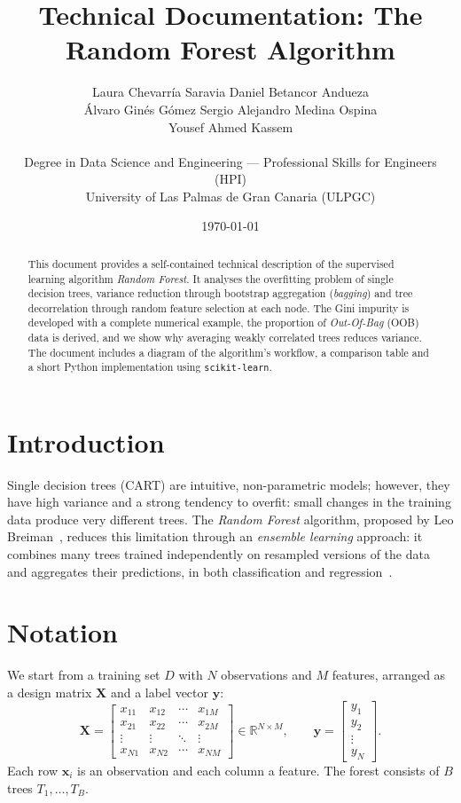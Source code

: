 \documentclass[12pt, a4paper]{article}
\title{\textbf{Technical Documentation: The Random Forest Algorithm}}
\author{
  \begin{tabular}{c}
    Laura Chevarría Saravia \qquad Daniel Betancor Andueza \\
    Álvaro Ginés Gómez \qquad Sergio Alejandro Medina Ospina \\
    Yousef Ahmed Kassem
  \end{tabular} \\[0.3cm]
  \small Degree in Data Science and Engineering --- Professional Skills for Engineers (HPI) \\
  \small University of Las Palmas de Gran Canaria (ULPGC)
}
\date{\today}
\begin{document}
\maketitle

\begin{abstract}
This document provides a self-contained technical description of the supervised learning algorithm \textit{Random Forest}. It analyses the overfitting problem of single decision trees, variance reduction through bootstrap aggregation (\textit{bagging}) and tree decorrelation through random feature selection at each node. The Gini impurity is developed with a complete numerical example, the proportion of \textit{Out-Of-Bag} (OOB) data is derived, and we show why averaging weakly correlated trees reduces variance. The document includes a diagram of the algorithm's workflow, a comparison table and a short Python implementation using \texttt{scikit-learn}.
\end{abstract}

\section{Introduction}
Single decision trees (CART) are intuitive, non-parametric models; however, they have high variance and a strong tendency to overfit: small changes in the training data produce very different trees. The \textit{Random Forest} algorithm, proposed by Leo Breiman~\cite{breiman2001}, reduces this limitation through an \textit{ensemble learning} approach: it combines many trees trained independently on resampled versions of the data and aggregates their predictions, in both classification and regression~\cite{salman2024}.

\section{Notation}
We start from a training set $D$ with $N$ observations and $M$ features, arranged as a design matrix $\mathbf{X}$ and a label vector $\mathbf{y}$:
\begin{equation}
\mathbf{X} =
\begin{bmatrix}
x_{11} & x_{12} & \cdots & x_{1M} \\
x_{21} & x_{22} & \cdots & x_{2M} \\
\vdots & \vdots & \ddots & \vdots \\
x_{N1} & x_{N2} & \cdots & x_{NM}
\end{bmatrix} \in \mathbb{R}^{N \times M},
\qquad
\mathbf{y} =
\begin{bmatrix}
y_1 \\ y_2 \\ \vdots \\ y_N
\end{bmatrix}.
\end{equation}
Each row $\mathbf{x}_i$ is an observation and each column a feature. The forest consists of $B$ trees $T_1, \dots, T_B$.
\end{document}

